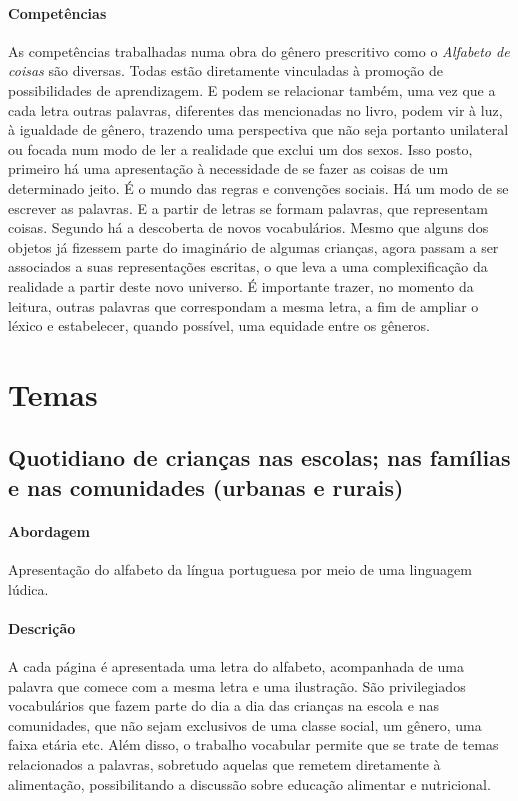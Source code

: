 \documentclass[11pt]{extarticle}
\begin{document}
\paragraph{Competências} 
As competências trabalhadas numa obra do gênero prescritivo como o 
\emph{Alfabeto de coisas} são diversas. 
Todas estão diretamente vinculadas à promoção de possibilidades de aprendizagem. E podem se relacionar também, uma vez que a cada letra outras palavras, diferentes das mencionadas no livro, podem vir à luz, à igualdade de gênero, trazendo uma perspectiva que não seja portanto unilateral ou focada num modo de ler a realidade que exclui um dos sexos. Isso posto, primeiro há uma apresentação à necessidade de se fazer as coisas de um determinado jeito. É o mundo das regras e convenções sociais. Há um modo de se escrever as palavras. E a partir de letras se formam palavras, que representam coisas. Segundo há a descoberta de novos vocabulários. Mesmo que alguns dos objetos já fizessem parte do imaginário de algumas crianças, agora passam a ser associados a suas representações escritas, o que leva a uma complexificação da realidade a partir deste novo universo. É importante trazer, no momento da leitura, outras palavras que correspondam a mesma letra, a fim de ampliar o léxico e estabelecer, quando possível, uma equidade entre os gêneros.

\section{Temas}

\subsection{Quotidiano de crianças nas escolas; nas famílias e nas comunidades (urbanas e rurais)}

\paragraph{Abordagem} 
Apresentação do alfabeto da língua portuguesa por meio de uma linguagem lúdica. 
\paragraph{Descrição} 
A cada página é apresentada uma letra do alfabeto, acompanhada de uma palavra que comece com a mesma letra e uma ilustração. São privilegiados vocabulários que fazem parte do dia a dia das crianças na escola e nas comunidades, que não sejam exclusivos de uma classe social, um gênero, uma faixa etária etc. Além disso, o trabalho vocabular permite que se trate de temas relacionados a palavras, sobretudo aquelas que remetem diretamente à alimentação, possibilitando a discussão sobre educação alimentar e nutricional.
\end{document}
